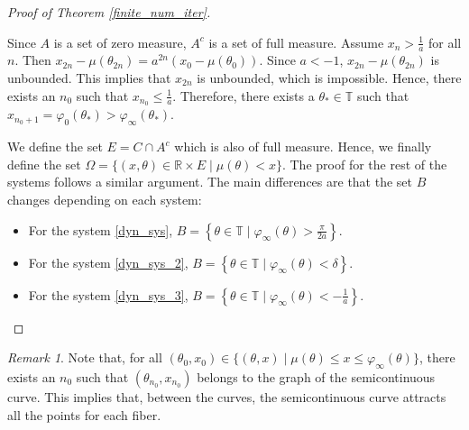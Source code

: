 \documentclass[12pt]{article}
\newcommand{\T}{\mathbb{T}}
\newcommand{\R}{\mathbb{R}}
\theoremstyle{plain}
\theoremstyle{remark}
\newtheorem{remark}[defn]{Remark}
\theoremstyle{definition}
\begin{document}
\begin{proof}[Proof of Theorem \ref{finite_num_iter}]
\begin{enumerate}
        Since $A$ is a set of zero measure, $A^c$ is a set of full measure. Assume $x_{n}>\frac{1}{a}$ for all $n$. Then $x_{2n}-\mu(\theta_{2n}) = a^{2n}(x_0-\mu(\theta_0))$. Since $a<-1$, $x_{2n}-\mu(\theta_{2n})$ is unbounded. This implies that $x_{2n}$ is unbounded, which is impossible. Hence, there exists an $n_0$ such that $x_{n_0}\leq\frac{1}{a}$. Therefore, there exists a $\theta_*\in\T$ such that $x_{n_0+1}=\varphi_0(\theta_*)>\varphi_\infty(\theta_*)$.
    \end{enumerate}
    We define the set $E=C\cap A^c$ which is also of full measure. Hence, we finally define the set $\Omega=\{(x,\theta)\in\R\times E\mid\mu(\theta)<x\}$. The proof for the rest of the systems follows a similar argument. The main differences are that the set $B$ changes depending on each system:
    \begin{itemize}
        \item For the system \eqref{dyn_sys}, $B = \left\{\theta\in\T\mid\varphi_\infty(\theta)>\frac{\pi}{2a}\right\}$.
        \item For the system \eqref{dyn_sys_2}, $B = \left\{\theta\in\T\mid\varphi_\infty(\theta)<\delta\right\}$.
        \item For the system \eqref{dyn_sys_3}, $B = \left\{\theta\in\T\mid\varphi_\infty(\theta)<-\frac{1}{a}\right\}$.
    \end{itemize}
\end{proof}
\begin{remark}
        Note that, for all $(\theta_0,x_0)\in\{(\theta,x)\mid\mu(\theta)\leq x\leq\varphi_\infty(\theta)\}$, there exists an $n_0$ such that $(\theta_{n_0},x_{n_0})$ belongs to the graph of the semicontinuous curve. This implies that, between the curves, the semicontinuous curve attracts all the points for each fiber.
    \end{remark}
\end{document}
